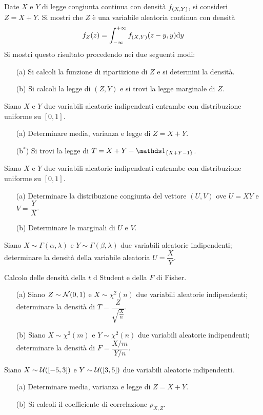 \Esercizio{}
Date $X$ e $Y$ di legge congiunta continua con densità $f_{(X,Y)}$, si consideri $Z=X+Y$. Si mostri che $Z$ è una variabile aleatoria continua con densità
\[
f_Z(z)=\int_{-\infty}^{+\infty} f_{(X,Y)}(z-y,y)\mathrm{d} y
\]
Si mostri questo risultato procedendo nei due seguenti modi:
\begin{enumerate}
\item [(a)] Si calcoli la funzione di ripartizione di $Z$ e si determini la densità.
\item [(b)] Si calcoli la legge di $(Z,Y)$ e si trovi la legge marginale di $Z$.
\end{enumerate}

\Esercizio{}
Siano $X$ e $Y$ due variabili aleatorie indipendenti entrambe con distribuzione uniforme su $[0,1]$.
\begin{enumerate}
\item [(a)] Determinare media, varianza e legge di $Z=X+Y$.
\item [(b$^*$)] Si trovi la legge di $T=X+Y-\Ind_{\{ X+Y-1 \}}$.
\end{enumerate}

\Esercizio{}
Siano $X$ e $Y$ due variabili aleatorie indipendenti entrambe con distribuzione uniforme su $[0,1]$.
\begin{enumerate}
\item [(a)] Determinare la distribuzione congiunta del vettore $(U,V)$ ove $U=XY$ e $V=\dfrac{Y}{X}$.
\item [(b)] Determinare le marginali di $U$ e $V$.
\end{enumerate}

\Esercizio{}
Siano $X\sim\Gamma(\alpha,\lambda)$ e $Y\sim\Gamma(\beta,\lambda)$ due variabili aleatorie indipendenti; determinare la densità della variabile aleatoria $U=\dfrac{X}{Y}$.

\Esercizio{} %
Calcolo delle densità della $t$ d Student e della $F$ di Fisher.
\begin{enumerate}
\item [(a)] Siano $Z\sim\mathcal{N}(0,1)$ e $X\sim\chi^2(n)$ due variabili aleatorie indipendenti; determinare la densità di $T=\dfrac{Z}{\sqrt{\frac{X}{n}}}$.
\item [(b)] Siano $X\sim\chi^2(m)$ e $Y\sim\chi^2(n)$ due variabili aleatorie indipendenti; determinare la densità di $F=\dfrac{X/m}{Y/n}$.
\end{enumerate}

\Esercizio{} %
Siano $X\sim\mathcal{U}([-5,3])$ e $Y\sim\mathcal{U}([3,5])$ due variabili aleatorie indipendenti.
\begin{enumerate}
\item [(a)] Determinare media, varianza e legge di $Z=X+Y$.
\item [(b)] Si calcoli il coefficiente di correlazione $\rho_{X,Z}$.
\end{enumerate}

